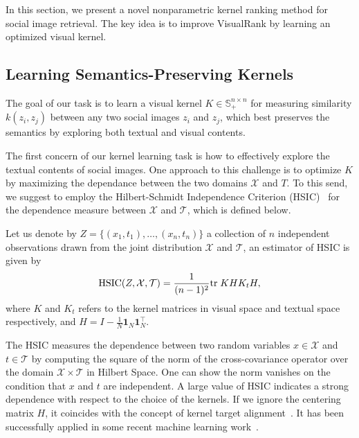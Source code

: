 In this section, we present a novel nonparametric kernel ranking method for social image retrieval. The key idea is to improve VisualRank by learning an optimized visual kernel.

\subsection{Learning Semantics-Preserving Kernels}

The goal of our task is to learn a visual kernel $K\in\mathbb{S}_+^{n\times n}$ for measuring similarity $k(z_i,z_j)$ between any two social images $z_i$ and $z_j$,
which best preserves the semantics by exploring both textual and visual contents.

The first concern of our kernel learning task is how to effectively explore the textual
contents of social images. One approach to this challenge is to optimize $K$ by
maximizing the dependance between the two domains $\mathcal{X}$ and ${T}$. To
this send, we suggest to employ the Hilbert-Schmidt Independence Criterion
(HSIC)~\cite{alt/GrettonBSS05} for the dependence measure between $\mathcal X$
and $\mathcal T$, which is defined below.

\begin{definition}
Let us denote by $Z=\{(x_1,t_1),\ldots,(x_n,t_n)\}$ a collection of $n$ independent observations drawn from the joint distribution $\mathcal{X}$ and $\mathcal{T}$, an estimator of HSIC is given by
\[
\mathrm{HSIC}(Z,\mathcal X, \mathcal T) = \frac{1}{(n - 1)^{2}} {\mbox{tr}\;} K H K_t H,
\]
where $K$ and $K_t$ refers to the kernel matrices in visual space and textual space respectively, and $H=I-\frac{1}{N}\mathbf{1}_N\mathbf{1}_N^{\top}$.
\end{definition}

The HSIC measures the dependence between two random variables
$x\in\mathcal{X}$ and $t\in\mathcal{T}$ by computing the square of the norm of the cross-covariance operator over the domain $\mathcal X \times \mathcal T$ in Hilbert Space. One can show the norm vanishes on the condition that $x$ and $t$ are independent. A large value of HSIC indicates a strong dependence with respect to the choice of the kernels. If we ignore the centering matrix $H$, it coincides with the concept of kernel target alignment~\cite{nips/CristianiniSEK01}. It has been successfully applied in some recent machine learning work~\cite{nips/SongSBG07}.

